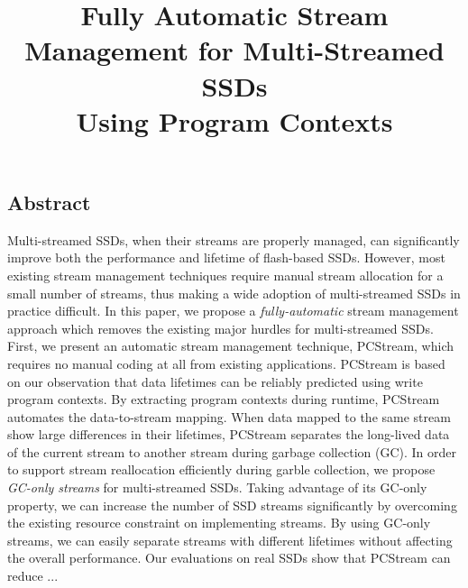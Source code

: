 \documentclass[letterpaper, twocolumn, 10pt]{article}
\begin{document}
\title{
\bf Fully Automatic Stream Management for Multi-Streamed SSDs \\ Using Program Contexts}

%


\maketitle
\pagestyle{empty}
\subsection*{Abstract}
Multi-streamed SSDs, when their streams are properly managed, 
can significantly improve both the performance and lifetime of flash-based SSDs.  
However, most existing stream management techniques
require manual stream allocation for a small number of streams, thus making 
a wide adoption of multi-streamed SSDs in practice difficult.  
In this paper, we propose a {\it fully-automatic} stream
management approach which removes the existing major hurdles for multi-streamed SSDs.  
First, we present  an automatic stream management technique, PCStream, which requires 
no manual coding at all from existing applications.   
PCStream is based on our observation that data lifetimes can be reliably predicted
using write program contexts.
By extracting program contexts during runtime, PCStream automates the data-to-stream mapping.  
When data mapped to the same stream show large differences in their lifetimes,
PCStream separates the long-lived data of the current stream to 
another stream during garbage collection (GC).   
In order to support stream reallocation efficiently during garble collection, 
we propose {\it GC-only streams} for multi-streamed SSDs.   
Taking advantage of its GC-only property, we can increase the number of SSD streams 
significantly by overcoming the existing resource constraint on implementing streams.  
By using GC-only streams, we can easily separate streams with
different lifetimes without affecting the overall performance.    
Our evaluations on real SSDs show that PCStream can reduce ...









\end{document}
